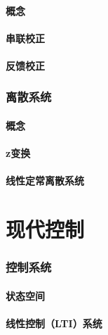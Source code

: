 \documentclass[
12pt, %
a4paper, 
oneside, %
headinclude,footinclude, %
]{scrartcl}
\begin{document}
\subsection[概念]{概念}
\subsection[串联校正]{串联校正}
\subsection[反馈校正]{反馈校正}
\section{离散系统}
\subsection[概念]{概念}
\subsection[z变换]{z变换}
\subsection[线性定常离散系统]{线性定常离散系统}
\part{现代控制}
\section{控制系统}
\subsection[状态空间]{状态空间}
\subsection[线性控制系统]{线性控制（LTI）系统}
\end{document}
